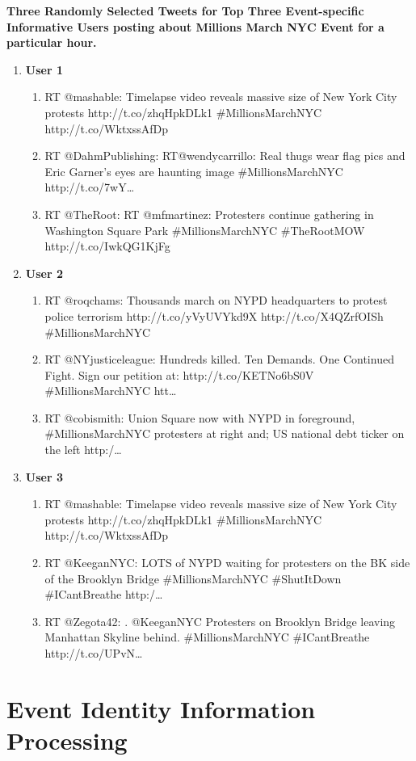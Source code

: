 \textbf{Three Randomly Selected Tweets for Top Three Event-specific Informative Users posting about Millions March NYC Event for a particular hour.}
\begin{enumerate}
\item \textbf{User 1}
\begin{enumerate}
\item RT @mashable: Timelapse video reveals massive size of New York City protests http://t.co/zhqHpkDLk1 \#MillionsMarchNYC http://t.co/WktxssAfDp
\item RT @DahmPublishing: RT@wendycarrillo: Real thugs wear flag pics and Eric Garner's eyes are haunting image \#MillionsMarchNYC http://t.co/7wY…
\item RT @TheRoot: RT @mfmartinez: Protesters continue gathering in Washington Square Park \#MillionsMarchNYC \#TheRootMOW http://t.co/IwkQG1KjFg
\end{enumerate}

\item \textbf{User 2}
\begin{enumerate}
\item RT @roqchams: Thousands march on NYPD headquarters to protest police terrorism http://t.co/yVyUVYkd9X http://t.co/X4QZrfOISh \#MillionsMarchNYC
\item RT @NYjusticeleague: Hundreds killed. Ten Demands. One Continued Fight.  Sign our petition at: http://t.co/KETNo6bS0V \#MillionsMarchNYC htt…
\item RT @cobismith: Union Square now with NYPD in foreground, \#MillionsMarchNYC protesters at right and; US national debt ticker on the left http:/…
\end{enumerate}

\item \textbf{User 3}
\begin{enumerate}
\item RT @mashable: Timelapse video reveals massive size of New York City protests http://t.co/zhqHpkDLk1 \#MillionsMarchNYC http://t.co/WktxssAfDp
\item RT @KeeganNYC: LOTS of NYPD waiting for protesters on the BK side of the Brooklyn Bridge \#MillionsMarchNYC \#ShutItDown \#ICantBreathe http:/…
\item RT @Zegota42: . @KeeganNYC Protesters on Brooklyn Bridge leaving Manhattan Skyline behind. \#MillionsMarchNYC \#ICantBreathe http://t.co/UPvN…
\end{enumerate}

\end{enumerate}


\section{Event Identity Information Processing\label{eventidentityinformationprocessing}}


